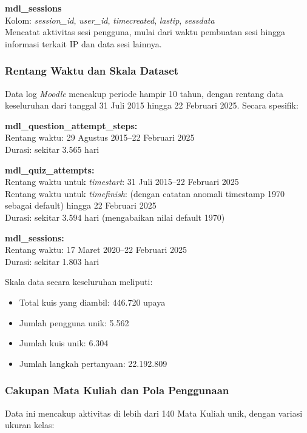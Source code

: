 \textbf{mdl\_sessions} \\
Kolom: \textit{session\_id}, \textit{user\_id}, \textit{timecreated}, \textit{lastip}, \textit{sessdata} \\
Mencatat aktivitas sesi pengguna, mulai dari waktu pembuatan sesi hingga informasi terkait IP dan data sesi lainnya.

\subsubsection{Rentang Waktu dan Skala Dataset}
\label{sec:rentangWaktuSkalaDataset}
Data log \textit{Moodle} mencakup periode hampir 10 tahun, dengan rentang data keseluruhan dari tanggal 31 Juli 2015 hingga 22 Februari 2025. Secara spesifik:

\textbf{mdl\_question\_attempt\_steps:} \\
Rentang waktu: 29 Agustus 2015--22 Februari 2025 \\
Durasi: sekitar 3.565 hari

\textbf{mdl\_quiz\_attempts:} \\
Rentang waktu untuk \textit{timestart}: 31 Juli 2015--22 Februari 2025 \\
Rentang waktu untuk \textit{timefinish}: (dengan catatan anomali timestamp 1970 sebagai default) hingga 22 Februari 2025 \\
Durasi: sekitar 3.594 hari (mengabaikan nilai default 1970)

\textbf{mdl\_sessions:} \\
Rentang waktu: 17 Maret 2020--22 Februari 2025 \\
Durasi: sekitar 1.803 hari

Skala data secara keseluruhan meliputi:
\begin{itemize}
    \item Total kuis yang diambil: 446.720 upaya
    \item Jumlah pengguna unik: 5.562
    \item Jumlah kuis unik: 6.304
    \item Jumlah langkah pertanyaan: 22.192.809
\end{itemize}

\subsubsection{Cakupan Mata Kuliah dan Pola Penggunaan}
\label{sec:cakupanMataKuliahPolaPenggunaan}
Data ini mencakup aktivitas di lebih dari 140 Mata Kuliah unik, dengan variasi ukuran kelas:

